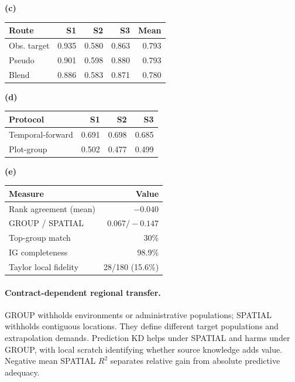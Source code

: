 \documentclass[runningheads]{venue/lncs/llncs}
\begin{document}
\begin{table}[t]
\begin{minipage}[t]{.49\linewidth}
\vspace{3pt}
\textbf{(c)}\\[-2pt]
\begin{tabular}{@{}lrrrr@{}}
\toprule
Route & S1 & S2 & S3 & Mean\\
\midrule
Obs. target & 0.935 & 0.580 & 0.863 & 0.793\\
Pseudo & 0.901 & 0.598 & 0.880 & 0.793\\
Blend & 0.886 & 0.583 & 0.871 & 0.780\\
\bottomrule
\end{tabular}

\end{minipage}\hfill
\begin{minipage}[t]{.49\linewidth}
\centering
\scriptsize
\textbf{(d)}\\[-2pt]
\begin{tabular}{@{}lrrr@{}}
\toprule
Protocol & S1 & S2 & S3\\
\midrule
Temporal-forward & 0.691 & 0.698 & 0.685\\
Plot-group & 0.502 & 0.477 & 0.499\\
\bottomrule
\end{tabular}

\vspace{3pt}
\textbf{(e)}\\[-2pt]
\begin{tabular}{@{}lr@{}}
\toprule
Measure & Value\\
\midrule
Rank agreement (mean) & $-0.040$\\
GROUP / SPATIAL & $0.067 / -0.147$\\
Top-group match & 30\%\\
IG completeness & 98.9\%\\
Taylor local fidelity & 28/180 (15.6\%)\\
\bottomrule
\end{tabular}
\end{minipage}
\end{table}

\paragraph{Contract-dependent regional transfer.}
GROUP withholds environments or administrative populations; SPATIAL withholds contiguous locations. They define different target populations and extrapolation demands. Prediction KD helps under SPATIAL and harms under GROUP, with local scratch identifying whether source knowledge adds value. Negative mean SPATIAL $R^2$ separates relative gain from absolute predictive adequacy.
\end{document}
